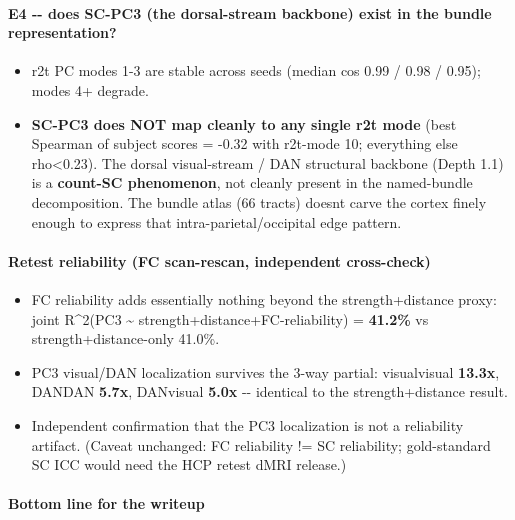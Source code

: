 \paragraph{E4 -\/- does SC-PC3 (the dorsal-stream backbone) exist in the bundle representation?}\label{e4----does-sc-pc3-the-dorsal-stream-backbone-exist-in-the-bundle-representation}

\begin{itemize}
\tightlist
\item
  r2t PC modes 1-3 are stable across seeds (median \textbar cos\textbar{} 0.99 / 0.98 / 0.95); modes 4+ degrade.
\item
  \textbf{SC-PC3 does NOT map cleanly to any single r2t mode} (best Spearman of subject scores = -0.32 with r2t-mode 10; everything else \textbar rho\textbar\textless0.23). The dorsal visual-stream / DAN structural backbone (Depth 1.1) is a \textbf{count-SC phenomenon}, not cleanly present in the named-bundle decomposition. The bundle atlas (66 tracts) doesn\textquotesingle t carve the cortex finely enough to express that intra-parietal/occipital edge pattern.
\end{itemize}

\paragraph{Retest reliability (FC scan-rescan, independent cross-check)}\label{retest-reliability-fc-scan-rescan-independent-cross-check}

\begin{itemize}
\tightlist
\item
  FC reliability adds essentially nothing beyond the strength+distance proxy: joint R\^{}2(\textbar PC3\textbar{} \textasciitilde{} strength+distance+FC-reliability) = \textbf{41.2\%} vs strength+distance-only 41.0\%.
\item
  PC3 visual/DAN localization survives the 3-way partial: visual\textbar\textbar visual \textbf{13.3x}, DAN\textbar\textbar DAN \textbf{5.7x}, DAN\textbar\textbar visual \textbf{5.0x} -\/- identical to the strength+distance result.
\item
  Independent confirmation that the PC3 localization is not a reliability artifact. (Caveat unchanged: FC reliability != SC reliability; gold-standard SC ICC would need the HCP retest dMRI release.)
\end{itemize}

\paragraph{Bottom line for the writeup}\label{bottom-line-for-the-writeup}

